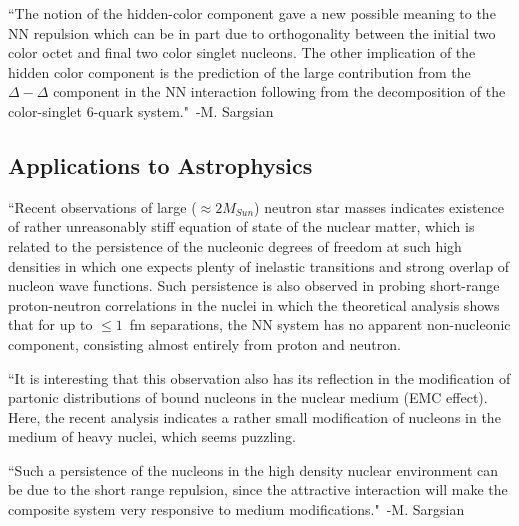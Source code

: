 ``The notion of the hidden-color component gave a new possible meaning to the NN repulsion which can be in part due to orthogonality between the initial two color octet and final two color singlet nucleons. The other implication of the hidden color component is the prediction of the large contribution from the $\Delta-\Delta$ component in the NN interaction following from the decomposition of the color-singlet 6-quark system."~-M. Sargsian~\cite{Sargsian:2014bwa}

\subsection{Applications to Astrophysics}
``Recent observations of large ($\approx 2M_{Sun}$) neutron star masses \cite{Demorest:2010bx} indicates existence of rather unreasonably stiff equation of state of the nuclear matter, which is related to the persistence of the nucleonic degrees of freedom \cite{Heiselberg:2000dn} at such high densities in which one expects plenty of inelastic transitions and strong overlap of nucleon wave functions. Such persistence is also observed in probing short-range proton-neutron correlations in the nuclei \cite{Subedi:2008zz,Piasetzky:2006ai} in which the theoretical analysis \cite{Frankfurt:2008zv} shows that for up to $\leq 1$~fm separations, the NN system has no apparent non-nucleonic component, consisting almost entirely from proton and neutron.

``It is interesting that this observation also has its reflection in the modification of partonic distributions of bound nucleons in the nuclear medium (EMC effect). Here, the recent analysis \cite{Frankfurt:2012qs} indicates a rather small modification of nucleons in the medium of heavy nuclei, which seems puzzling.

``Such a persistence of the nucleons in the high density nuclear environment can be due to the short range repulsion, since the attractive interaction will make the composite system very responsive to medium modifications."~-M. Sargsian~\cite{Sargsian:2014bwa}